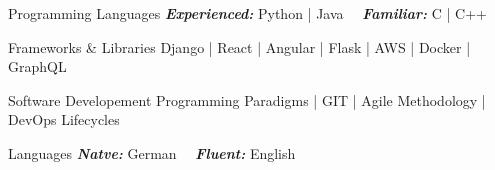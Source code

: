 
\begin{cvskills}
  \cvskill
    {Programming Languages} %
    {\textbf{\emph{Experienced:}} Python | Java  \ \ \textbf{\emph{Familiar:}} C | C++} %

  \cvskill
    {Frameworks \& Libraries} %
    {Django | React | Angular | Flask | AWS | Docker | GraphQL} %

  \cvskill
    {Software Developement} %
    {Programming Paradigms | GIT | Agile Methodology | DevOps Lifecycles} %

  \cvskill
    {Languages} %
    {\textbf{\emph{Natve:}} German \ \ \textbf{\emph{Fluent:}} English} %
\end{cvskills}